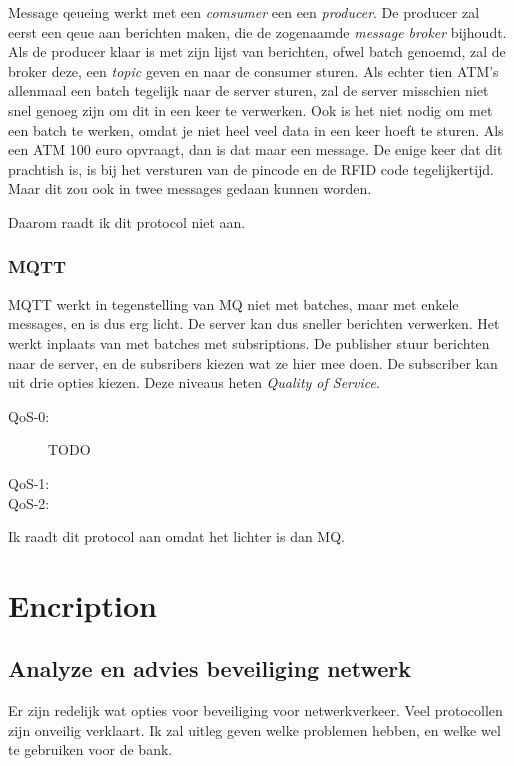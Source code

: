 \documentclass{article}
\begin{document}
Message qeueing werkt met een \emph{comsumer} een een \emph{producer}.
De producer zal eerst een qeue aan berichten maken, die de zogenaamde \emph{message broker} bijhoudt.
Als de producer klaar is met zijn lijst van berichten, ofwel batch genoemd, zal de broker deze, een \emph{topic} geven en naar de consumer sturen.
Als echter tien ATM's allenmaal een batch tegelijk naar de server sturen, zal de server misschien niet snel genoeg zijn om dit in een keer te verwerken.
Ook is het niet nodig om met een batch te werken, omdat je niet heel veel data in een keer hoeft te sturen.
Als een ATM 100 euro opvraagt, dan is dat maar een message.
De enige keer dat dit prachtish is, is bij het versturen van de pincode en de RFID code tegelijkertijd.
Maar dit zou ook in twee messages gedaan kunnen worden.

Daarom raadt ik dit protocol niet aan.

\subsubsection{MQTT}

MQTT werkt in tegenstelling van MQ niet met batches, maar met enkele messages, en is dus erg licht.
De server kan dus sneller berichten verwerken.
Het werkt inplaats van met batches met subsriptions.
De publisher stuur berichten naar de server, en de subsribers kiezen wat ze hier mee doen.
De subscriber kan uit drie opties kiezen.
Deze niveaus heten \emph{Quality of Service}.

\begin{description}
\item [QoS-0:] TODO
\item [QoS-1:]
\item [QoS-2:]
\end{description}

Ik raadt dit protocol aan omdat het lichter is dan MQ.

\section{Encription}

\newpage

\subsection{Analyze en advies beveiliging netwerk} 

Er zijn redelijk wat opties voor beveiliging voor netwerkverkeer.
Veel protocollen zijn onveilig verklaart.
Ik zal uitleg geven welke problemen hebben, en welke wel te gebruiken voor de bank.
\end{document}
